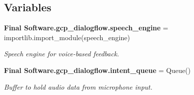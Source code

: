 \subsection*{Variables}
\begin{DoxyCompactItemize}
\item 
\textbf{ Final Software.\+gcp\+\_\+dialogflow.\+speech\+\_\+engine} = importlib.\+import\+\_\+module(\textquotesingle{}speech\+\_\+engine\textquotesingle{})
\begin{DoxyCompactList}\small\item\em Speech engine for voice-\/based feedback. \end{DoxyCompactList}\item 
\textbf{ Final Software.\+gcp\+\_\+dialogflow.\+intent\+\_\+queue} = Queue()
\begin{DoxyCompactList}\small\item\em Buffer to hold audio data from microphone input. \end{DoxyCompactList}\end{DoxyCompactItemize}
